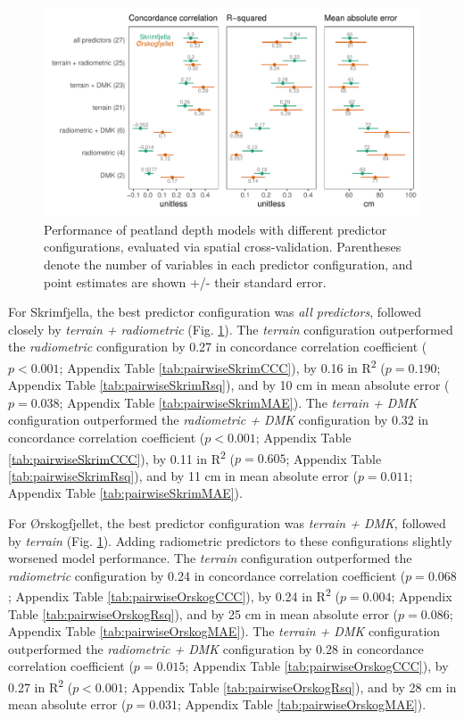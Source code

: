\documentclass[soil, manuscript]{copernicus}
\begin{document}
\begin{figure}
\includegraphics[width=1\linewidth]{figures/modelmetrics} \caption{Performance of peatland depth models with different predictor configurations, evaluated via spatial cross-validation. Parentheses denote the number of variables in each predictor configuration, and point estimates are shown +/- their standard error.}\label{fig:modelMetrics}
\end{figure}

For Skrimfjella, the best predictor configuration was \emph{all predictors}, followed closely by \emph{terrain + radiometric} (Fig. \ref{fig:modelMetrics}).
The \emph{terrain} configuration outperformed the \emph{radiometric} configuration by 0.27 in concordance correlation coefficient (\(p < 0.001\); Appendix Table \ref{tab:pairwiseSkrimCCC}), by 0.16 in R\textsuperscript{2} (\(p = 0.190\); Appendix Table \ref{tab:pairwiseSkrimRsq}), and by 10 cm in mean absolute error (\(p = 0.038\); Appendix Table \ref{tab:pairwiseSkrimMAE}).
The \emph{terrain + DMK} configuration outperformed the \emph{radiometric + DMK} configuration by 0.32 in concordance correlation coefficient (\(p < 0.001\); Appendix Table \ref{tab:pairwiseSkrimCCC}), by 0.11 in R\textsuperscript{2} (\(p = 0.605\); Appendix Table \ref{tab:pairwiseSkrimRsq}), and by 11 cm in mean absolute error (\(p = 0.011\); Appendix Table \ref{tab:pairwiseSkrimMAE}).

For Ørskogfjellet, the best predictor configuration was \emph{terrain + DMK}, followed by \emph{terrain} (Fig. \ref{fig:modelMetrics}).
Adding radiometric predictors to these configurations slightly worsened model performance.
The \emph{terrain} configuration outperformed the \emph{radiometric} configuration by 0.24 in concordance correlation coefficient (\(p = 0.068\); Appendix Table \ref{tab:pairwiseOrskogCCC}), by 0.24 in R\textsuperscript{2} (\(p = 0.004\); Appendix Table \ref{tab:pairwiseOrskogRsq}), and by 25 cm in mean absolute error (\(p = 0.086\); Appendix Table \ref{tab:pairwiseOrskogMAE}).
The \emph{terrain + DMK} configuration outperformed the \emph{radiometric + DMK} configuration by 0.28 in concordance correlation coefficient (\(p = 0.015\); Appendix Table \ref{tab:pairwiseOrskogCCC}), by 0.27 in R\textsuperscript{2} (\(p < 0.001\); Appendix Table \ref{tab:pairwiseOrskogRsq}), and by 28 cm in mean absolute error (\(p = 0.031\); Appendix Table \ref{tab:pairwiseOrskogMAE}).
\end{document}
